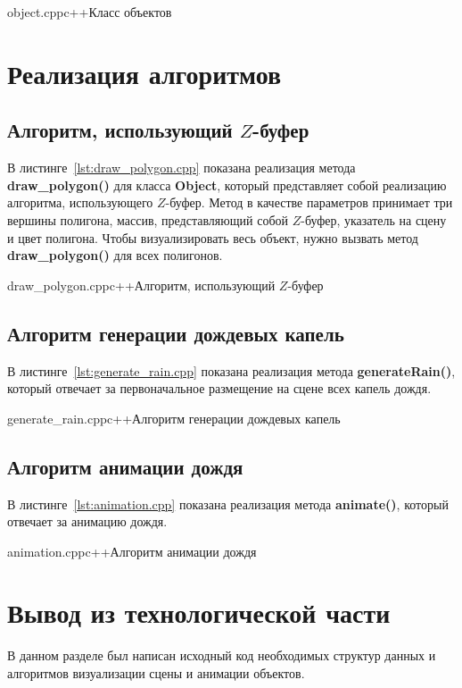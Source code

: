 {object.cpp}{c++}{Класс объектов}

\section{Реализация алгоритмов}

\subsection{Алгоритм, использующий $Z$-буфер}

В листинге~\ref{lst:draw_polygon.cpp} показана реализация метода \textbf{draw\_polygon()} для класса \textbf{Object}, который представляет собой реализацию алгоритма, использующего $Z$-буфер. 
Метод в качестве параметров принимает три вершины полигона, массив, представляющий собой $Z$-буфер, указатель на сцену и цвет полигона. 
Чтобы визуализировать весь объект, нужно вызвать метод \textbf{draw\_polygon()} для всех полигонов.

{draw_polygon.cpp}{c++}{Алгоритм, использующий $Z$-буфер}

\subsection{Алгоритм генерации дождевых капель}

В листинге~\ref{lst:generate_rain.cpp} показана реализация метода \textbf{generateRain()}, который отвечает за первоначальное размещение на сцене всех капель дождя.

{generate_rain.cpp}{c++}{Алгоритм генерации дождевых капель}

\pagebreak
\subsection{Алгоритм анимации дождя}

В листинге~\ref{lst:animation.cpp} показана реализация метода \textbf{animate()}, который отвечает за анимацию дождя.

{animation.cpp}{c++}{Алгоритм анимации дождя}

\section*{Вывод из технологической части}

В данном разделе был написан исходный код необходимых структур данных и алгоритмов визуализации сцены и анимации объектов. 

